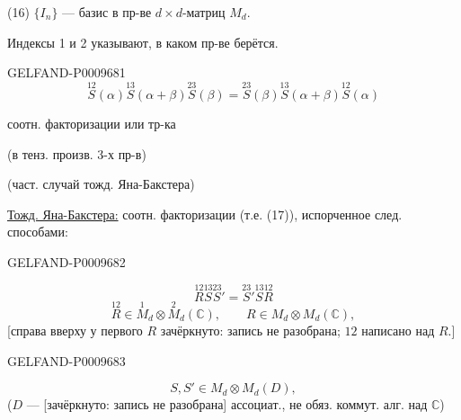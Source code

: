 (16) $\{I_n\}$ --- базис в пр-ве $d\times d$-матриц $M_d$.

Индексы 1 и 2 указывают, в каком пр-ве берётся.

\begin{GelfandAdjacentEvidence}{GELFAND-P000968}{1}
\begin{equation*}
 \overset{12}{S}(\alpha)\overset{13}{S}(\alpha+\beta)\overset{23}{S}(\beta)
 =\overset{23}{S}(\beta)\overset{13}{S}(\alpha+\beta)\overset{12}{S}(\alpha)
 \tag{17}
\end{equation*}
\begin{flushright}соотн. факторизации или тр-ка\end{flushright}
(в тенз. произв. 3-х пр-в)

(част. случай тожд. Яна-Бакстера)

\underline{Тожд. Яна-Бакстера:} соотн. факторизации (т.е. (17)), испорченное след. способами:
\end{GelfandAdjacentEvidence}
\begin{GelfandAdjacentEvidence}{GELFAND-P000968}{2}

\begin{equation*}
 \overset{12}{R}\overset{13}{S}\overset{23}{S}'
 =\overset{23}{S}'\overset{13}{S}\overset{12}{R}\tag{18}
\end{equation*}
\begin{equation*}
 \overset{12}{R}\in\overset{1}{M}_d\otimes\overset{2}{M}_d(\mathbb C),\qquad
 R\in M_d\otimes M_d(\mathbb C),\tag{19}
\end{equation*}
[справа вверху у первого $R$ зачёркнуто: запись не разобрана; $12$ написано над $R$.]
\end{GelfandAdjacentEvidence}
\begin{GelfandAdjacentEvidence}{GELFAND-P000968}{3}

\begin{equation*}
 S,S'\in M_d\otimes M_d(D),\tag{20}
\end{equation*}
($D$ --- [зачёркнуто: запись не разобрана] ассоциат., не обяз. коммут. алг. над $\mathbb C$)
\end{GelfandAdjacentEvidence}
